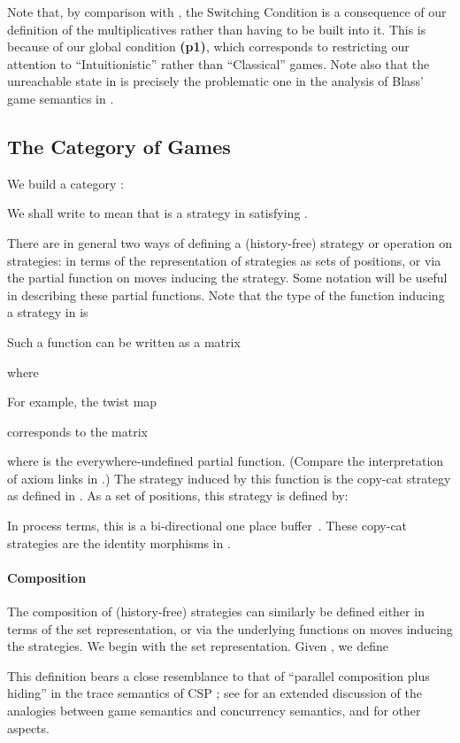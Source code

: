 \documentclass[11pt]{article}
\newcommand{\Games}{\mbox{}}
\begin{document}
Note that, by comparison with \cite{AbramskyS:gamfcm}, the Switching Condition is
a consequence of our definition of the multiplicatives rather than
having to be built into it.
This is because of our global condition {\bf (p1)}, which corresponds to
restricting our attention to ``Intuitionistic'' rather than ``Classical'' games.
Note also that the unreachable state  in  is precisely
the problematic one in  the analysis of Blass' game semantics in \cite{AbramskyS:gamfcm}.

\subsection{The Category of Games}
We build a category \Games:

We shall write  to mean that  is a strategy in
 satisfying .

There are in general two ways of defining a (history-free) strategy or operation
on strategies: in terms of the representation of strategies as sets of
positions, or via the partial function on moves inducing the strategy.
Some notation
will be useful in describing these partial functions.
Note that the type of the function  inducing a strategy in 
is

Such a function can be written as a matrix

where


For example, the twist map

corresponds to the matrix

where  is the everywhere-undefined partial function.
(Compare the interpretation
of axiom links in \cite{GirardJY:geoi1i}.) The strategy induced by this function is
the copy-cat strategy as defined in \cite{AbramskyS:gamfcm}.
As a set of positions, this strategy is defined by:


In process terms, this is a bi-directional one place
buffer~\cite{AbramskyS:prop}.
These copy-cat strategies are the identity morphisms in \Games .

\paragraph{Composition}
The composition of (history-free) strategies can similarly
be defined either
in terms of the set representation, or via the underlying functions on moves
inducing the strategies.  We begin with the set representation.
Given , we define

This definition bears a close resemblance to that of ``parallel composition
plus hiding'' in the trace semantics of CSP \cite{HoareCAR:comsp};
see \cite{AbramskyS:gamfcm} for an extended
discussion of the analogies between game semantics and concurrency
semantics, and \cite{AbramskyS:prop} for other aspects.
\end{document}
